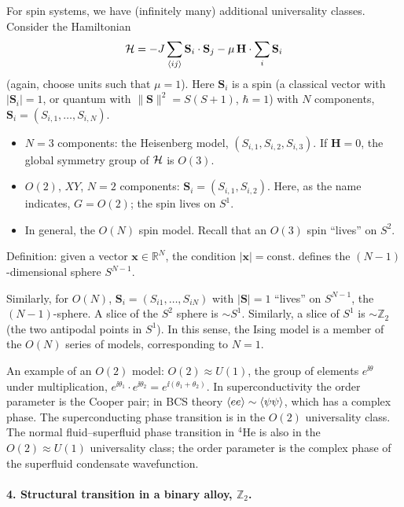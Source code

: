 For spin systems, we have (infinitely many) additional universality classes. Consider
the Hamiltonian
\begin{equation}
  \mathcal{H} = -J\sum_{\langle ij\rangle}\mathbf{S}_i\cdot\mathbf{S}_j
         - \mu\,\mathbf{H}\cdot\sum_i\mathbf{S}_i
\end{equation}
(again, choose units such that $\mu = 1$). Here $\mathbf{S}_i$ is a spin (a classical
vector with $|\mathbf{S}_i| = 1$, or quantum with $\|\mathbf{S}\|^2 = S(S+1)$, $\hbar = 1$)
with $N$ components, $\mathbf{S}_i = (S_{i,1},\ldots,S_{i,N})$.
\begin{itemize}
  \item $N = 3$ components: the Heisenberg model, $(S_{i,1},S_{i,2},S_{i,3})$. If
    $\mathbf{H} = 0$, the global symmetry group of $\mathcal{H}$ is $O(3)$.
  \item $O(2)$, $XY$, $N = 2$ components: $\mathbf{S}_i = (S_{i,1},S_{i,2})$. Here, as the
    name indicates, $G = O(2)$; the spin lives on $S^1$.
  \item In general, the $O(N)$ spin model. Recall that an $O(3)$ spin ``lives'' on $S^2$.
\end{itemize}
Definition: given a vector $\mathbf{x}\in\mathbb{R}^N$, the condition
$|\mathbf{x}| = \text{const.}$ defines the $(N-1)$-dimensional sphere $S^{N-1}$.

Similarly, for $O(N)$, $\mathbf{S}_i = (S_{i1},\ldots,S_{iN})$ with $|\mathbf{S}| = 1$
``lives'' on $S^{N-1}$, the $(N-1)$-sphere. A slice of the $S^2$ sphere is $\sim S^1$.
Similarly, a slice of $S^1$ is $\sim\mathbb{Z}_2$ (the two antipodal points in $S^1$). In
this sense, the Ising model is a member of the $O(N)$ series of models, corresponding to
$N = 1$.

An example of an $O(2)$ model: $O(2)\approx U(1)$, the group of elements $e^{\ii\theta}$
under multiplication, $e^{\ii\theta_1}\cdot e^{\ii\theta_2} = e^{\ii(\theta_1+\theta_2)}$.
In superconductivity the order parameter is the Cooper pair; in BCS theory
$\langle ee\rangle\sim\langle \psi\psi\rangle$, which has a complex phase. The superconducting phase
transition is in the $O(2)$ universality class. The normal fluid--superfluid phase
transition in $^4$He is also in the $O(2)\approx U(1)$ universality class; the order
parameter is the complex phase of the superfluid condensate wavefunction.

\paragraph{4. Structural transition in a binary alloy, \texorpdfstring{$\mathbb{Z}_2$}{Z2}.}

